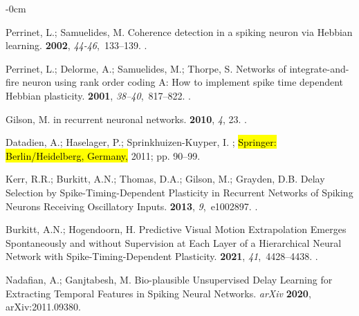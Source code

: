 \documentclass[brainsci, %
               review,accept,pdftex,moreauthors
               ]{Definitions/mdpi}
\begin{document}
\begin{adjustwidth}{-\extralength}{0cm}
\begin{thebibliography}{999}
Perrinet, L.; Samuelides, M.
\newblock Coherence detection in a spiking neuron via {Hebbian} learning.
 {\bf 2002}, {\em 44-46},~133--139.
.

Perrinet, L.; Delorme, A.; Samuelides, M.; Thorpe, S.
\newblock Networks of integrate-and-fire neuron using rank order coding {A}:
  {How} to implement spike time dependent {Hebbian} plasticity.
 {\bf 2001}, {\em 38--40},~817--822.
.

Gilson, M.
 in recurrent neuronal networks.
 {\bf 2010}, {\em 4}, 23.
.

Datadien, A.; Haselager, P.; Sprinkhuizen-Kuyper, I.
; \hl{Springer:  Berlin/Heidelberg, Germany,} %
 2011;
\newblock pp. 90--99.

Kerr, R.R.; Burkitt, A.N.; Thomas, D.A.; Gilson, M.; Grayden, D.B.
\newblock Delay {Selection} by {Spike}-{Timing}-{Dependent} {Plasticity} in
  {Recurrent} {Networks} of {Spiking} {Neurons} {Receiving} {Oscillatory}
  {Inputs}.
 {\bf 2013}, {\em 9},~e1002897.
.

Burkitt, A.N.; Hogendoorn, H.
\newblock Predictive {Visual} {Motion} {Extrapolation} {Emerges}
  {Spontaneously} and without {Supervision} at {Each} {Layer} of a
  {Hierarchical} {Neural} {Network} with {Spike}-{Timing}-{Dependent}
  {Plasticity}.
 {\bf 2021}, {\em 41},~4428--4438.
.

Nadafian, A.; Ganjtabesh, M.
\newblock Bio-plausible {Unsupervised} {Delay} {Learning} for {Extracting}
  {Temporal} {Features} in {Spiking} {Neural} {Networks}. \emph{arXiv}  \textbf{2020},  	arXiv:2011.09380.


\end{thebibliography}
\end{adjustwidth}
\end{document}
